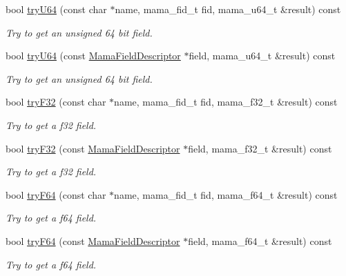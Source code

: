\begin{DoxyCompactItemize}
bool \hyperlink{classWombat_1_1MamaMsg_a1b0913afc43050d0992aac4dc97e56c4}{tryU64} (const char $\ast$name, mama\_\-fid\_\-t fid, mama\_\-u64\_\-t \&result) const 
\begin{DoxyCompactList}\small\item\em Try to get an unsigned 64 bit field. \item\end{DoxyCompactList}\item 
bool \hyperlink{classWombat_1_1MamaMsg_ae51b09b277379a8435709aaeda584e61}{tryU64} (const \hyperlink{classWombat_1_1MamaFieldDescriptor}{MamaFieldDescriptor} $\ast$field, mama\_\-u64\_\-t \&result) const 
\begin{DoxyCompactList}\small\item\em Try to get an unsigned 64 bit field. \item\end{DoxyCompactList}\item 
bool \hyperlink{classWombat_1_1MamaMsg_a51cbc48817fbdc8bf85a004ffe926f3a}{tryF32} (const char $\ast$name, mama\_\-fid\_\-t fid, mama\_\-f32\_\-t \&result) const 
\begin{DoxyCompactList}\small\item\em Try to get a f32 field. \item\end{DoxyCompactList}\item 
bool \hyperlink{classWombat_1_1MamaMsg_ada8ad2dd3f82346e585af21033ea9298}{tryF32} (const \hyperlink{classWombat_1_1MamaFieldDescriptor}{MamaFieldDescriptor} $\ast$field, mama\_\-f32\_\-t \&result) const 
\begin{DoxyCompactList}\small\item\em Try to get a f32 field. \item\end{DoxyCompactList}\item 
bool \hyperlink{classWombat_1_1MamaMsg_a024ab789f073d6e097d52cfc308d08c7}{tryF64} (const char $\ast$name, mama\_\-fid\_\-t fid, mama\_\-f64\_\-t \&result) const 
\begin{DoxyCompactList}\small\item\em Try to get a f64 field. \item\end{DoxyCompactList}\item 
bool \hyperlink{classWombat_1_1MamaMsg_a991a82daccf2c15042afcdb81269c5b0}{tryF64} (const \hyperlink{classWombat_1_1MamaFieldDescriptor}{MamaFieldDescriptor} $\ast$field, mama\_\-f64\_\-t \&result) const 
\begin{DoxyCompactList}\small\item\em Try to get a f64 field. \item\end{DoxyCompactList}\item 

\end{DoxyCompactItemize}
